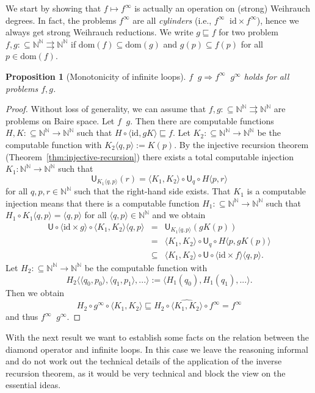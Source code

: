 \documentclass[11pt,a4paper]{amsart}
\theoremstyle{plain}
\newtheorem{prop}[thm]{Proposition}
\theoremstyle{definition}
\theoremstyle{defC}
\theoremstyle{thmC}
\theoremstyle{plain}
\numberwithin{equation}{section}
\def\IN{{\mathbb{N}}}
\def\TO{\Longrightarrow}
\def\In{\subseteq}
\def\prefix{\sqsubseteq}
\def\mto{\rightrightarrows}
\def\U{{\mathsf{{U}}}}
\def\leqW{\mathop{\leq_{\mathrm{W}}}}
\def\leqSW{\mathop{\leq_{\mathrm{sW}}}}
\def\equivSW{\mathop{\equiv_{\mathrm{sW}}}}
\def\leqW{\mathop{\leq_{\mathrm{W}}}}
\def\leqSW{\mathop{\leq_{\mathrm{sW}}}}
\def\equivSW{\mathop{\equiv_{\mathrm{sW}}}}
\def\id{{\mathrm{id}}}
\def\dom{{\mathrm{dom}}}
\begin{document}
We start by showing that $f\mapsto f^\infty$ is actually an operation on (strong) Weihrauch degrees.
In fact, the problems $f^\infty$ are all {\em cylinders} (i.e., $f^\infty\equivSW\id\times f^\infty$), 
hence we always get strong Weihrauch reductions. We write $g\prefix f$ for two problem $f,g:\In\IN^\IN\mto\IN^\IN$
if $\dom(f)\In\dom(g)$ and $g(p)\In f(p)$ for all $p\in\dom(f)$.

\begin{prop}[Monotonicity of infinite loops]
\label{prop:monotonicity}
$f\leqW g\TO f^\infty\leqSW g^\infty$ holds for all problems $f,g$.
\end{prop}
\begin{proof}
Without loss of generality, we can assume that $f,g:\In\IN^\IN\mto\IN^\IN$ are problems on Baire space.
Let $f\leqW g$. Then there are computable functions $H,K:\In\IN^\IN\to\IN^\IN$ such that
$H\circ\langle\id, gK\rangle\prefix f$. 
Let $K_2:\In\IN^\IN\to\IN^\IN$ be the computable function
with $K_2\langle q,p\rangle:=K(p)$. 
By the injective recursion theorem (Theorem~\ref{thm:injective-recursion}) 
there exists a total computable injection $K_1:\IN^\IN\to\IN^\IN$ such that
\[\U_{K_1\langle q,p\rangle}(r)=\langle K_1, K_2\rangle\circ\U_q \circ H\langle p,r\rangle\]
for all $q,p,r\in\IN^\IN$ such that the right-hand side exists.
That $K_1$ is a computable injection means that there is a computable function $H_1:\In\IN^\IN\to\IN^\IN$ such that $H_1\circ K_1\langle q,p\rangle=\langle q,p\rangle$
for all $\langle q,p\rangle\in\IN^\IN$ and we obtain
\begin{eqnarray*}
\U\circ\langle\id\times g\rangle\circ \langle K_1, K_2\rangle\langle q,p\rangle
&=&\U_{K_1\langle q,p\rangle}(gK(p))\\
&=&\langle K_1,K_2\rangle\circ\U_q\circ H\langle p,gK(p)\rangle\\
&\In&\langle K_1, K_2\rangle\circ \U\circ\langle\id\times f\rangle\langle q,p\rangle.
\end{eqnarray*}
Let $H_2:\In\IN^\IN\to\IN^\IN$ be the computable function with 
\[H_2\langle\langle q_0,p_0\rangle,\langle q_1,p_1\rangle,...\rangle:=\langle H_1(q_0),H_1(q_1),...\rangle.\]
Then we obtain 
\[H_2\circ g^\infty\circ\langle K_1,K_2\rangle\prefix H_2\circ\widehat{\langle K_1,K_2\rangle}\circ f^\infty=f^\infty\]
and thus $f^\infty\leqSW g^\infty$.
\end{proof}

\noindent
With the next result we want to establish some facts on the relation between the diamond operator
and infinite loops. In this case we leave the reasoning informal and do not work out the 
technical details of the application of the inverse recursion theorem, as it would be very
technical and block the view on the essential ideas.
\end{document}
